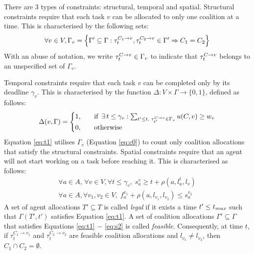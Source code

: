 There are $3$ types of constraints: structural, temporal and spatial. Structural
constraints require that each task $v$ can be allocated to only one coalition at a time.
This is characterised by the following sets:
\begin{equation}\label{eq:c0}
    \forall v \in V, \Gamma_v = \left\{ \Gamma' \subseteq \Gamma :
    \tau^{C_1 \rightarrow v}_{t}, \tau^{C_2 \rightarrow v}_{t} \in \Gamma' \Rightarrow C_1 = C_2 \right\}
\end{equation}
With an abuse of notation, we write $\tau^{C \rightarrow v}_{t} \in \Gamma_v$
to indicate that $\tau^{C \rightarrow v}_{t}$ belongs to an unspecified set of $\Gamma_v$.
\iffalse
In other words, if $\alloc{a_1}{t}$, $\alloc{a_2}{t} \in T$, then $\alloc{ \{ a_1, a_2
\}}{t} \in \Gamma_v$.
\fi
Temporal constraints require that each task $v$ can be completed only by its deadline
$\gamma_v$. This is characterised by the function $\Delta : V \times \Gamma \rightarrow
\{0, 1 \}$, defined as follows:
\begin{equation}\label{eq:t1}
    \Delta(v, \Gamma) =
    \begin{cases}
        1 \text{,} & \quad \text{if }\, \exists\, t \leq \gamma_v :
        \sum_{t' \leq t \text{, } \tau^{C \rightarrow v}_{t'} \in \Gamma_v} u(C, v) \geq w_v\\
        0 \text{,} & \quad \text{otherwise}
    \end{cases}
\end{equation}
Equation \ref{eq:t1} utilises $\Gamma_v$ (Equation \ref{eq:c0}) to count only coalition
allocations that satisfy the structural constraints.
Spatial constraints require that an agent will not start working on a task
before reaching it. This is characterised as follows:
\begin{gather}
    \forall a \in A,\, \forall v \in V, \forall t \leq \gamma_v,\; s_a^v \geq t +
    \rho(a, l_a^t, l_v)\label{eq:s1}\\
    \forall a \in A, \forall v_1, v_2 \in V,\; f_a^{v_1} + \rho(a, l_{v_1},
    l_{v_2}) \leq s_a^{v_2}\label{eq:s2}
\end{gather}
A set of agent allocations $T' \subseteq T$ is called \emph{legal} if it exists
a time $t' \leq t_{max}$ such that $\Gamma(T', t')$ satisfies Equation \ref{eq:t1}.
A set of coalition allocations $\Gamma' \subseteq \Gamma$ that satisfies
Equations \ref{eq:t1} $-$ \ref{eq:s2} is called \emph{feasible}. Consequently, at time
$t$, if $\tau_{t}^{C_1 \rightarrow v_1}$ and $\tau_{t}^{C_2 \rightarrow v_2}$ are feasible
coalition allocations and $l_{v_1} \neq l_{v_2}$, then $C_1 \cap C_2 = \emptyset$.

